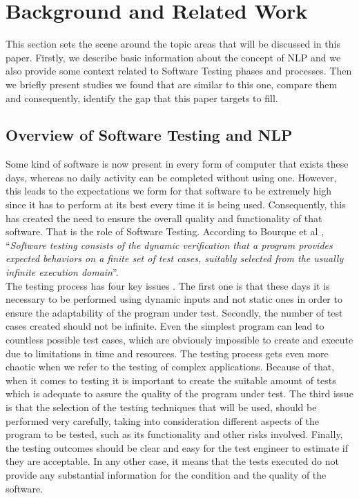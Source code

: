 \chapter{Background and Related Work}

This section sets the scene around the topic areas that will be discussed in this paper. Firstly, we describe basic information about the concept of NLP and we also 
provide some context related to Software Testing phases and processes. Then we briefly present studies we found that are similar to this one, compare them and consequently, 
identify the gap that this paper targets to fill. 

\section {Overview of Software Testing and NLP}

Some kind of software is now present in every form of computer that exists these days, whereas no daily activity can be completed without using one. However, this leads to the expectations we 
form for that software to be extremely high since it has to perform at its best every time it is being used. Consequently, this has created the need to ensure the overall quality and functionality of that 
software. That is the role of Software Testing. According to Bourque et al \cite{swebok}, ``\emph{Software testing consists of the dynamic verification that a program provides expected behaviors on a 
finite set of test cases, suitably selected from the usually infinite execution domain}''.\\

The testing process has four key issues \cite{swebok}. The first one is that these days it is necessary to be performed using dynamic inputs and not static ones in order to ensure the adaptability 
of the program under test. Secondly, the number of test cases created should not be infinite. Even the simplest program can lead to 
countless possible test cases, which are obviously impossible to create and execute due to limitations in time and resources. The testing process gets even more chaotic when we refer to the testing of complex 
applications. Because of that, when it comes to testing it is important to create the suitable amount of tests which is adequate to assure the quality of the program under test. The third issue is that the 
selection of the testing techniques that will be used, should be performed very carefully, taking into consideration different aspects of the program to be tested, such as its functionality and other risks 
involved. Finally, the testing outcomes should be clear and easy for the test engineer to estimate if they are acceptable. In any other case, it means that the tests executed do not provide any 
substantial information for the condition and the quality of the software. \\

